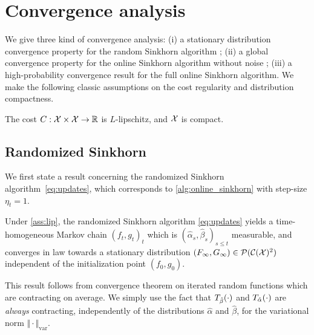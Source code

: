 

\section{Convergence analysis}

We give three kind of convergence analysis: (i) a stationary distribution convergence property for the random Sinkhorn
algorithm ; (ii) a global convergence property for the online Sinkhorn algorithm without noise ; (iii) a high-probability convergence result for the full online Sinkhorn algorithm. We make the following classic assumptions on the cost regularity and distribution compactness.

\begin{assumption}\label{ass:lip}
    The cost $C: \mathcal{X} \times \mathcal{X} \to \mathbb{R}$ is $L$-lipschitz, and $\mathcal{X}$ is  compact.
\end{assumption}

\subsection{Randomized Sinkhorn}

We first state a result concerning the randomized Sinkhorn algorithm~\eqref{eq:updates}, which corresponds to
\autoref{alg:online_sinkhorn} with step-size $\eta_t = 1$.

\begin{proposition}\label{prop:markov}
    Under \autoref{ass:lip}, the randomized Sinkhorn algorithm \eqref{eq:updates} yields a time-homogeneous
    Markov chain ${(f_t, g_t)}_t$ which is $(\hat \alpha_s, \hat \beta_s)_{s \leq
    t}$ measurable, and converges in law towards a stationary distribution
    $(F_\infty, G_\infty) \in \mathcal{P}(\mathcal{C}(\mathcal{X})^2)$ independent of the initialization
    point $(f_0, g_0)$.
\end{proposition}

This result follows from \citet{diaconis_iterated} convergence theorem on
iterated random functions which are contracting on average. We simply use the
fact that $T_{\hat \beta}(\cdot)$ and $T_{\hat \alpha}(\cdot)$ are
\textit{always} contracting, independently of the distributions $\hat \alpha$ and
$\hat \beta$, for the variational norm $\Vert \cdot \Vert_{\text{var}}$.


